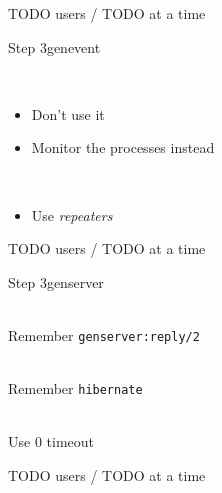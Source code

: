 \documentclass[utf8]{beamer}
\begin{document}
\begin{frame}
TODO users / TODO at a time
\end{frame}

\begin{frame}{Step 3}{gen\textunderscore event}
	\begin{description}
		\item<+->[sup\textunderscore handler]\ \\
			\begin{itemize}
				\item Don't use it
				\item Monitor the processes instead
			\end{itemize}
		\item<+->[Long Delivery Queues]\ \\
			\begin{itemize}
				\item Use \emph{repeaters}
			\end{itemize}
	\end{description}
\end{frame}

\begin{frame}
TODO users / TODO at a time
\end{frame}

\begin{frame}{Step 3}{gen\textunderscore server}
	\begin{description}
		\item<+->[Call Timeouts]\ \\
			Remember \texttt{gen\textunderscore server:reply/2}
		\item<+->[Memory Footprint]\ \\
			Remember \texttt{hibernate}
		\item<+->[Long \texttt{init/1}]\ \\
			Use $0$ timeout
	\end{description}
\end{frame}

\begin{frame}
TODO users / TODO at a time
\end{frame}

\lstset{language=erlang}
\end{document}
